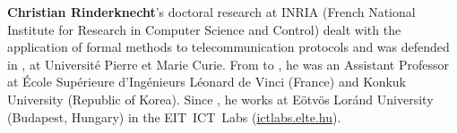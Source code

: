 \noindent\textbf{Christian Rinderknecht}'s doctoral
research at INRIA (French National Institute for Research in Computer
Science and Control) dealt with the application of formal methods to
telecommunication protocols and was defended in
, at Universit\'e Pierre et Marie Curie. From
 to , he was an Assistant Professor at \'Ecole Sup\'erieure d'Ing\'enieurs L\'eonard de Vinci (France) and Konkuk University (Republic of Korea). Since , he works at E\"otv\"os Lor\'and University (Budapest, Hungary) in the EIT~ICT~Labs ({\small \url{ictlabs.elte.hu}}).
